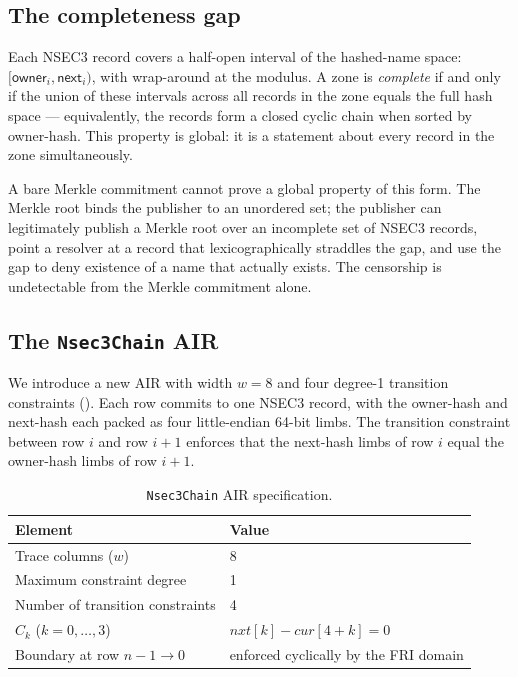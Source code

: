 \documentclass[11pt,a4paper]{article}
\theoremstyle{definition}
\theoremstyle{plain}
\begin{document}
\subsection{The completeness gap}

Each NSEC3 record covers a half-open interval of the hashed-name space:
$[\mathsf{owner}_i, \mathsf{next}_i)$, with wrap-around at the modulus.
A zone is \emph{complete} if and only if the union of these intervals
across all records in the zone equals the full hash space — equivalently,
the records form a closed cyclic chain when sorted by owner-hash.  This
property is global: it is a statement about every record in the zone
simultaneously.

A bare Merkle commitment cannot prove a global property of this form.
The Merkle root binds the publisher to an unordered set; the publisher
can legitimately publish a Merkle root over an incomplete set of NSEC3
records, point a resolver at a record that lexicographically straddles
the gap, and use the gap to deny existence of a name that actually
exists.  The censorship is undetectable from the Merkle commitment
alone.

\subsection{The \texttt{Nsec3Chain} AIR}

We introduce a new AIR with width $w = 8$ and four degree-1 transition
constraints ().  Each row commits to one NSEC3
record, with the owner-hash and next-hash each packed as four
little-endian 64-bit limbs.  The transition constraint between row $i$
and row $i+1$ enforces that the next-hash limbs of row $i$ equal the
owner-hash limbs of row $i+1$.

\begin{table}[h]
\centering\small
\begin{tabular}{ll}
\toprule
Element & Value \\
\midrule
Trace columns ($w$) & 8 \\
Maximum constraint degree & 1 \\
Number of transition constraints & 4 \\
$C_k$ ($k = 0,\dots,3$) & $\mathit{nxt}[k] - \mathit{cur}[4 + k] = 0$ \\
Boundary at row $n - 1 \to 0$ & enforced cyclically by the FRI domain \\
\bottomrule
\end{tabular}
\caption{\texttt{Nsec3Chain} AIR specification.}
\label{tab:nsec3-air}
\end{table}
\end{document}
